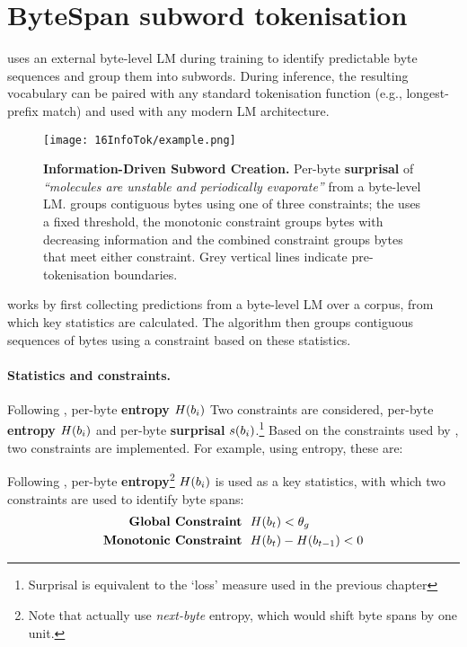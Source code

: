 \section{ByteSpan subword tokenisation}\label{sec:16-bytespan}

\tokname uses an external byte-level LM during training to identify predictable byte sequences and group them into subwords. During inference, the resulting vocabulary can be paired with any standard tokenisation function (e.g., longest-prefix match) and used with any modern LM architecture. %

\begin{figure}[!t]
    \centering
    \texttt{[image: 16InfoTok/example.png]}
    \caption{\textbf{Information-Driven Subword Creation.}
    Per-byte \textbf{surprisal} of \textit{\enquote{molecules are unstable and periodically evaporate}} from a byte-level LM. \tokname groups contiguous bytes using one of three constraints; the  uses a fixed threshold, the monotonic constraint groups bytes with decreasing information and the combined constraint groups bytes that meet either constraint. Grey vertical lines indicate pre-tokenisation boundaries.
    }
    \label{fig:16-example}
\end{figure}

\tokname works by first collecting predictions from a byte-level LM over a corpus, from which key statistics are calculated. The algorithm then groups contiguous sequences of bytes using a constraint based on these statistics.

\paragraph{Statistics and constraints.} Following \citet{pagnoni2024byte}, per-byte \textbf{entropy} \(H(b_i)\) Two constraints are considered, per-byte \textbf{entropy} \(H(b_i)\) and per-byte \textbf{surprisal} \(s(b_i)\).\footnote{Surprisal is equivalent to the `loss' measure used in the previous chapter} Based on the constraints used by \citet{pagnoni2024byte}, two constraints are implemented. For example, using entropy, these are:


Following \citet{pagnoni2024byte}, per-byte \textbf{entropy}\footnote{Note that \citet{pagnoni2024byte} actually use \emph{next-byte} entropy, which would shift byte spans by one unit.} \(H(b_i)\) is used as a key statistics, with which two constraints are used to identify byte spans: 
\begin{align}
    \mathrm{\textbf{Global~Constraint}} &~~ H(b_t) < \theta_g \\
    \mathrm{\textbf{Monotonic~Constraint}} &~~ H(b_t) - H(b_{t-1}) < 0 
\end{align}

